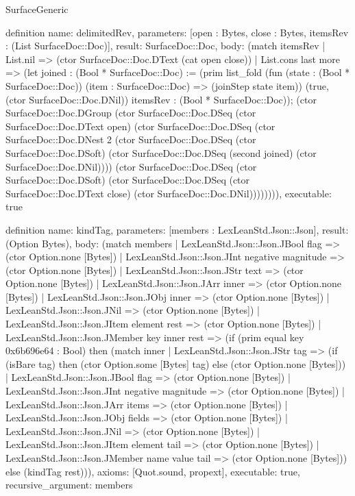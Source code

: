 \begin{lexlean}{SurfaceGeneric}
\begin{semanticmodule}
definition{
  name: delimitedRev,
  parameters: [open : Bytes, close : Bytes, itemsRev : (List SurfaceDoc::Doc)],
  result: SurfaceDoc::Doc,
  body: (match itemsRev
    | List.nil => (ctor SurfaceDoc::Doc.DText (cat open close))
    | List.cons last more => (let joined : (Bool * SurfaceDoc::Doc) := (prim list_fold (fun (state : (Bool * SurfaceDoc::Doc)) (item : SurfaceDoc::Doc) => (joinStep state item)) (true, (ctor SurfaceDoc::Doc.DNil)) itemsRev : (Bool * SurfaceDoc::Doc)); (ctor SurfaceDoc::Doc.DGroup (ctor SurfaceDoc::Doc.DSeq (ctor SurfaceDoc::Doc.DText open) (ctor SurfaceDoc::Doc.DSeq (ctor SurfaceDoc::Doc.DNest 2 (ctor SurfaceDoc::Doc.DSeq (ctor SurfaceDoc::Doc.DSoft) (ctor SurfaceDoc::Doc.DSeq (second joined) (ctor SurfaceDoc::Doc.DNil)))) (ctor SurfaceDoc::Doc.DSeq (ctor SurfaceDoc::Doc.DSoft) (ctor SurfaceDoc::Doc.DSeq (ctor SurfaceDoc::Doc.DText close) (ctor SurfaceDoc::Doc.DNil)))))))),
  executable: true
}

definition{
  name: kindTag,
  parameters: [members : LexLeanStd.Json::Json],
  result: (Option Bytes),
  body: (match members
    | LexLeanStd.Json::Json.JBool flag => (ctor Option.none [Bytes])
    | LexLeanStd.Json::Json.JInt negative magnitude => (ctor Option.none [Bytes])
    | LexLeanStd.Json::Json.JStr text => (ctor Option.none [Bytes])
    | LexLeanStd.Json::Json.JArr inner => (ctor Option.none [Bytes])
    | LexLeanStd.Json::Json.JObj inner => (ctor Option.none [Bytes])
    | LexLeanStd.Json::Json.JNil => (ctor Option.none [Bytes])
    | LexLeanStd.Json::Json.JItem element rest => (ctor Option.none [Bytes])
    | LexLeanStd.Json::Json.JMember key inner rest => (if (prim equal key 0x6b696e64 : Bool) then (match inner
      | LexLeanStd.Json::Json.JStr tag => (if (isBare tag) then (ctor Option.some [Bytes] tag) else (ctor Option.none [Bytes]))
      | LexLeanStd.Json::Json.JBool flag => (ctor Option.none [Bytes])
      | LexLeanStd.Json::Json.JInt negative magnitude => (ctor Option.none [Bytes])
      | LexLeanStd.Json::Json.JArr items => (ctor Option.none [Bytes])
      | LexLeanStd.Json::Json.JObj fields => (ctor Option.none [Bytes])
      | LexLeanStd.Json::Json.JNil => (ctor Option.none [Bytes])
      | LexLeanStd.Json::Json.JItem element tail => (ctor Option.none [Bytes])
      | LexLeanStd.Json::Json.JMember name value tail => (ctor Option.none [Bytes])) else (kindTag rest))),
  axioms: [Quot.sound, propext],
  executable: true,
  recursive_argument: members
}


\end{semanticmodule}
\end{lexlean}

